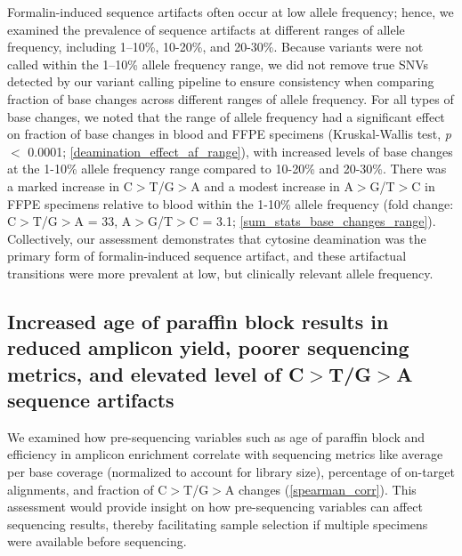 \documentclass{bmcart}
\begin{document}
Formalin-induced sequence artifacts often occur at low allele frequency; hence, we examined the prevalence of sequence artifacts at different ranges of allele frequency, including 1--10\%, 10-20\%, and 20-30\%. Because variants were not called within the 1--10\% allele frequency range, we did not remove true SNVs detected by our variant calling pipeline to ensure consistency when comparing fraction of base changes across different ranges of allele frequency. For all types of base changes, we noted that the range of allele frequency had a significant effect on fraction of base changes in blood and FFPE specimens (Kruskal-Wallis test, \textit{p} $<$ 0.0001; \autoref{deamination_effect_af_range}), with increased levels of base changes at the 1-10\% allele frequency range compared to 10-20\% and 20-30\%. There was a marked increase in C$>$T/G$>$A and a modest increase in A$>$G/T$>$C in FFPE specimens relative to blood within the 1-10\% allele frequency (fold change: C$>$T/G$>$A = 33, A$>$G/T$>$C = 3.1; \autoref{sum_stats_base_changes_range}). Collectively, our assessment demonstrates that cytosine deamination was the primary form of formalin-induced sequence artifact, and these artifactual transitions were more prevalent at low, but clinically relevant allele frequency.

\subsection*{Increased age of paraffin block results in reduced amplicon yield, poorer sequencing metrics, and elevated level of C$>$T/G$>$A sequence artifacts}

We examined how pre-sequencing variables such as age of paraffin block and efficiency in amplicon enrichment correlate with sequencing metrics like average per base coverage (normalized to account for library size), percentage of on-target alignments, and fraction of C$>$T/G$>$A changes (\autoref{spearman_corr}). This assessment would provide insight on how pre-sequencing variables can affect sequencing results, thereby facilitating sample selection if multiple specimens were available before sequencing.
\end{document}
